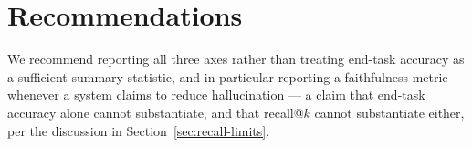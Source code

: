 \documentclass[11pt]{article}
\begin{document}
\section{Recommendations}
\label{sec:recs}

We recommend reporting all three axes rather than treating end-task
accuracy as a sufficient summary statistic, and in particular reporting
a faithfulness metric whenever a system claims to reduce hallucination
--- a claim that end-task accuracy alone cannot substantiate, and that
recall@$k$ cannot substantiate either, per the discussion in
Section~\ref{sec:recall-limits}.

\printbibliography
\end{document}
